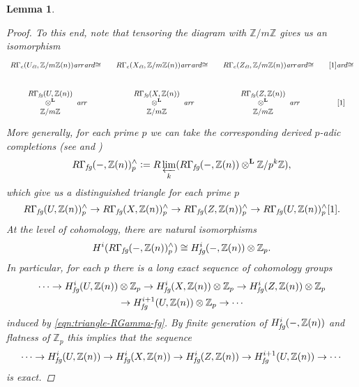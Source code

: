 \documentclass[10pt,a4paper,oneside,draft]{article}
\newcommand{\ZZ}{\mathbb{Z}}
\newcommand{\ar}{\text{\it ar}}
\newcommand{\et}{\text{\it \'{e}t}}
\newcommand{\fg}{\text{\it fg}}
\newcommand{\dfn}{\mathrel{\mathop:}=}
\theoremstyle{myplain}
\newtheorem{lemma}[theorem]{Lemma}
\theoremstyle{mydefinition}
\numberwithin{equation}{section}
\begin{document}
\begin{lemma}
\begin{proof}
    To this end, note that tensoring the diagram with $\ZZ/m\ZZ$ gives us an
    isomorphism
    \[ \begin{tikzcd}[column sep=1em,font=\small]
        R\Gamma_c (U_\et, \ZZ/m\ZZ (n)) \ar{r}\ar{d}{\cong} & R\Gamma_c (X_\et, \ZZ/m\ZZ (n)) \ar{r}\ar{d}{\cong} & R\Gamma_c (Z_\et, \ZZ/m\ZZ (n)) \ar{r}\ar{d}{\cong} & {[1]}\ar{d}{\cong} \\
        \begin{array}{c} R\Gamma_\fg (U, \ZZ (n)) \\ \otimes^\mathbf{L} \\ \ZZ/m\ZZ \end{array} \ar{r} & \begin{array}{c} R\Gamma_\fg (X, \ZZ (n)) \\ \otimes^\mathbf{L} \\ \ZZ/m\ZZ \end{array} \ar{r} & \begin{array}{c} R\Gamma_\fg (Z, \ZZ (n)) \\ \otimes^\mathbf{L} \\ \ZZ/m\ZZ \end{array} \ar{r} & {[1]}
      \end{tikzcd} \]
    More generally, for each prime $p$ we can take the corresponding derived
    $p$-adic completions (see \cite{Bhatt-Scholze-2015} and
    \cite[Tag~091N]{Stacks-project})
    \[ R\Gamma_\fg (-, \ZZ(n))^\wedge_p \dfn
      R\varprojlim_k (R\Gamma_\fg (-, \ZZ(n)) \otimes^\mathbf{L} \ZZ/p^k\ZZ), \]
    which give us a distinguished triangle for each prime $p$
    \[ R\Gamma_\fg (U, \ZZ(n))^\wedge_p \to
      R\Gamma_\fg (X, \ZZ(n))^\wedge_p \to
      R\Gamma_\fg (Z, \ZZ(n))^\wedge_p \to
      R\Gamma_\fg (U, \ZZ(n))^\wedge_p [1]. \]
    At the level of cohomology, there are natural isomorphisms
    \cite[Tag~0A06]{Stacks-project}
    \[ H^i (R\Gamma_\fg (-, \ZZ(n))^\wedge_p) \cong
      H^i_\fg (-, \ZZ(n)) \otimes \ZZ_p. \]
    In particular, for each $p$ there is a long exact sequence of cohomology
    groups
    \begin{multline*}
      \cdots \to H^i_\fg (U, \ZZ(n)) \otimes \ZZ_p \to
      H^i_\fg (X, \ZZ(n)) \otimes \ZZ_p \to
      H^i_\fg (Z, \ZZ(n)) \otimes \ZZ_p \\
      \to H^{i+1}_\fg (U, \ZZ(n)) \otimes \ZZ_p \to \cdots
    \end{multline*}
    induced by \eqref{eqn:triangle-RGamma-fg}. By finite generation of
    $H^i_\fg (-, \ZZ(n))$ and flatness of $\ZZ_p$ this implies that the sequence
    \begin{equation}
      \label{eqn:RGamma-fg-long-exact-sequence}
      \cdots \to H^i_\fg (U, \ZZ(n)) \to
      H^i_\fg (X, \ZZ(n)) \to
      H^i_\fg (Z, \ZZ(n)) \to
      H^{i+1}_\fg (U, \ZZ(n)) \to \cdots
    \end{equation}
    is exact.


\end{proof}
\end{lemma}
\end{document}
